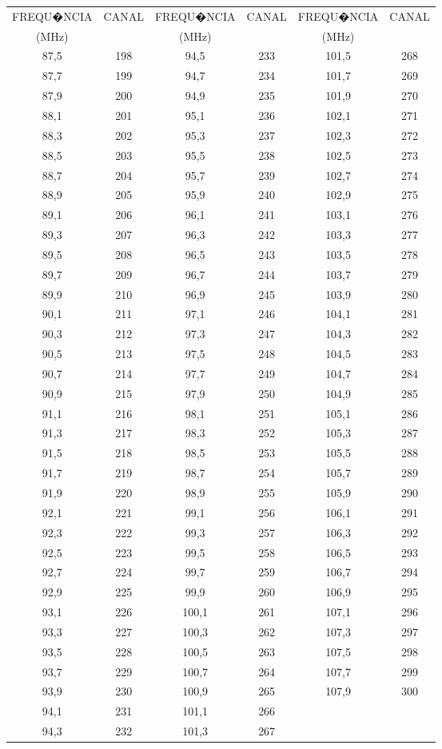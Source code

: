 \def\tablename{Tabela}
\begin{table}
\vspace*{0.05cm}
\centering

\begin{tabular}{|c|c|c|c|c|c|} \hline

FREQU�NCIA & CANAL & FREQU�NCIA & CANAL & FREQU�NCIA & CANAL\\
 (MHz)&  & (MHz) &  & (MHz) &  \\ \hline
87,5 & 198 & 94,5 & 233 & 101,5 & 268\\
87,7 & 199 & 94,7 & 234 & 101,7 & 269\\
87,9 & 200 & 94,9 & 235 & 101,9 & 270\\
88,1 & 201 & 95,1 & 236 & 102,1 & 271\\
88,3 & 202 & 95,3 & 237 & 102,3 & 272\\
88,5 & 203 & 95,5 & 238 & 102,5 & 273\\
88,7 & 204 & 95,7 & 239 & 102,7 & 274\\
88,9 & 205 & 95,9 & 240 & 102,9 & 275\\
89,1 & 206 & 96,1 & 241 & 103,1 & 276\\
89,3 & 207 & 96,3 & 242 & 103,3 & 277\\
89,5 & 208 & 96,5 & 243 & 103,5 & 278\\
89,7 & 209 & 96,7 & 244 & 103,7 & 279\\
89,9 & 210 & 96,9 & 245 & 103,9 & 280\\
90,1 & 211 & 97,1 & 246 & 104,1 & 281\\
90,3 & 212 & 97,3 & 247 & 104,3 & 282\\
90,5 & 213 & 97,5 & 248 & 104,5 & 283\\
90,7 & 214 & 97,7 & 249 & 104,7 & 284\\
90,9 & 215 & 97,9 & 250 & 104,9 & 285\\
91,1 & 216 & 98,1 & 251 & 105,1 & 286\\
91,3 & 217 & 98,3 & 252 & 105,3 & 287\\
91,5 & 218 & 98,5 & 253 & 105,5 & 288\\
91,7 & 219 & 98,7 & 254 & 105,7 & 289\\
91,9 & 220 & 98,9 & 255 & 105,9 & 290\\
92,1 & 221 & 99,1 & 256 & 106,1 & 291\\
92,3 & 222 & 99,3 & 257 & 106,3 & 292\\
92,5 & 223 & 99,5 & 258 & 106,5 & 293\\
92,7 & 224 & 99,7 & 259 & 106,7 & 294\\
92,9 & 225 & 99,9 & 260 & 106,9 & 295\\
93,1 & 226 & 100,1 & 261 & 107,1 & 296\\
93,3 & 227 & 100,3 & 262 & 107,3 & 297\\
93,5 & 228 & 100,5 & 263 & 107,5 & 298\\
93,7 & 229 & 100,7 & 264 & 107,7 & 299\\
93,9 & 230 & 100,9 & 265 & 107,9 & 300\\
94,1 & 231 & 101,1 & 266 & & \\
94,3 & 232 & 101,3 & 267 & & \\ \hline


\end{tabular}
\end{table}
